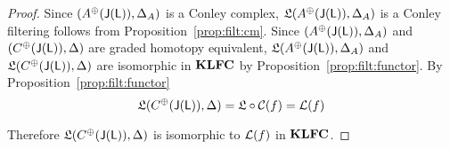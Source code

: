 \begin{proof}
Since $(A^\oplus({\mathsf J}({\mathsf L})),\Delta_A)$ is a Conley complex, $\mathfrak{L}(A^\oplus({\mathsf J}({\mathsf L})),\Delta_A)$ is a Conley filtering follows from Proposition~\ref{prop:filt:cm}.  Since $(A^\oplus({\mathsf J}({\mathsf L})),\Delta_A)$ and $(C^\oplus({\mathsf J}({\mathsf L})),\Delta)$ are graded homotopy equivalent, $\mathfrak{L}(A^\oplus({\mathsf J}({\mathsf L})),\Delta_A)$ and $\mathfrak{L}(C^\oplus({\mathsf J}({\mathsf L})),\Delta)$ are isomorphic in ${\bf KLFC}$ by Proposition~\ref{prop:filt:functor}.  By Proposition~\ref{prop:filt:functor} 
\[
\mathfrak{L}(C^\oplus({\mathsf J}({\mathsf L})),\Delta) = \mathfrak{L}\circ {\mathcal C}(f) = {\mathcal L}(f)
\]

Therefore $\mathfrak{L}(C^\oplus({\mathsf J}({\mathsf L})),\Delta)$ is isomorphic to ${\mathcal L}(f)$ in ${\bf KLFC}$.

\end{proof}









